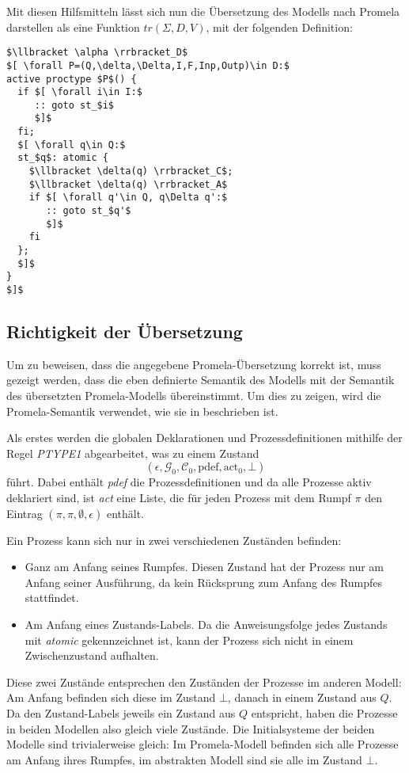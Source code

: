 Mit diesen Hilfsmitteln lässt sich nun die Übersetzung des Modells nach Promela darstellen als eine Funktion $tr(\Sigma,D,V)$, mit der folgenden Definition:
\begin{lstlisting}[language=Promela,mathescape=true]
$\llbracket \alpha \rrbracket_D$
$[ \forall P=(Q,\delta,\Delta,I,F,Inp,Outp)\in D:$
active proctype $P$() {
  if $[ \forall i\in I:$
     :: goto st_$i$
     $]$
  fi;
  $[ \forall q\in Q:$
  st_$q$: atomic {
    $\llbracket \delta(q) \rrbracket_C$;
    $\llbracket \delta(q) \rrbracket_A$
    if $[ \forall q'\in Q, q\Delta q':$
       :: goto st_$q'$
       $]$
    fi
  };
  $]$
}
$]$
\end{lstlisting}
\subsection{Richtigkeit der Übersetzung}
Um zu beweisen, dass die angegebene Promela-Übersetzung korrekt ist, muss gezeigt werden, dass die eben definierte Semantik des Modells mit der Semantik des übersetzten Promela-Modells übereinstimmt.
Um dies zu zeigen, wird die Promela-Semantik verwendet, wie sie in \cite{Weise97anincremental} beschrieben ist.

Als erstes werden die globalen Deklarationen und Prozessdefinitionen mithilfe der Regel \emph{PTYPE1} abgearbeitet, was zu einem Zustand
\[ (\epsilon,\mathcal{G}_0,\mathcal{C}_0,\textrm{pdef},\textrm{act}_0,\bot) \]
führt.
Dabei enthält \emph{pdef} die Prozessdefinitionen und da alle Prozesse aktiv deklariert sind, ist \emph{act} eine Liste, die für jeden Prozess mit dem Rumpf $\pi$ den Eintrag $(\pi,\pi,\emptyset,\epsilon)$ enthält.

Ein Prozess kann sich nur in zwei verschiedenen Zuständen befinden:
\begin{itemize}
\item Ganz am Anfang seines Rumpfes.
  Diesen Zustand hat der Prozess nur am Anfang seiner Ausführung, da kein Rücksprung zum Anfang des Rumpfes stattfindet.
\item Am Anfang eines Zustands-Labels.
  Da die Anweisungsfolge jedes Zustands mit \emph{atomic} gekennzeichnet ist, kann der Prozess sich nicht in einem Zwischenzustand aufhalten.
\end{itemize}

Diese zwei Zustände entsprechen den Zuständen der Prozesse im anderen Modell:
Am Anfang befinden sich diese im Zustand $\bot$, danach in einem Zustand aus $Q$.
Da den Zustand-Labels jeweils ein Zustand aus $Q$ entspricht, haben die Prozesse in beiden Modellen also gleich viele Zustände.
Die Initialsysteme der beiden Modelle sind trivialerweise gleich:
Im Promela-Modell befinden sich alle Prozesse am Anfang ihres Rumpfes, im abstrakten Modell sind sie alle im Zustand $\bot$.


